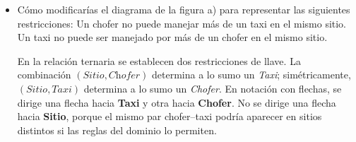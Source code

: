 \begin{itemize}
    \item Cómo modificarías el diagrama de la figura a) para representar las siguientes restricciones:
          Un chofer no puede manejar más de un taxi en el mismo sitio. Un taxi no puede ser manejado por más de un chofer en el mismo sitio.

        En la relación ternaria se establecen dos restricciones de llave. La
        combinación $(\textit{Sitio},\textit{Chofer})$ determina a lo sumo un
        \textit{Taxi}; simétricamente,
        $(\textit{Sitio},\textit{Taxi})$ determina a lo sumo un
        \textit{Chofer}. En notación con flechas, se dirige una flecha hacia
        \textbf{Taxi} y otra hacia \textbf{Chofer}. No se dirige una flecha
        hacia \textbf{Sitio}, porque el mismo par chofer--taxi podría aparecer
        en sitios distintos si las reglas del dominio lo permiten.

\end{itemize}
